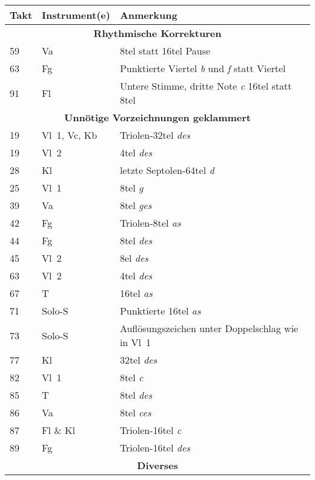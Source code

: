\documentclass[a4paper,9pt]{extarticle}
\newcommand{\note}[1]{\textsl{#1}}
\begin{document}
\begin{center}

\begin{tabular}{lll}
\toprule
\textbf{Takt} & \textbf{Instrument(e)} & \textbf{Anmerkung}\\

\midrule
\multicolumn{3}{c}{\textbf{Rhythmische Korrekturen}}\\
\midrule
59 & Va & 8tel statt 16tel Pause\\
63 & Fg & Punktierte Viertel \note{b} und \note{f} statt Viertel\\
91 & Fl & Untere Stimme, dritte Note \note{c} 16tel statt 8tel\\

\midrule
\multicolumn{3}{c}{\textbf{Unnötige Vorzeichnungen geklammert}}\\
\midrule
19 & Vl~1, Vc, Kb & Triolen-32tel \note{des}\\
19 & Vl~2 & 4tel \note{des}\\
28 & Kl & letzte Septolen-64tel \note{d}\\
25 & Vl~1 & 8tel \note{g}\\
39 & Va &  8tel \note{ges}\\
42 & Fg & Triolen-8tel \note{as}\\
44 & Fg & 8tel \note{des}\\
45 & Vl~2 & 8el \note{des}\\
63 & Vl~2 & 4tel \note{des}\\
67 & T & 16tel \note{as}\\
71 & Solo-S & Punktierte 16tel \note{as}\\
73 & Solo-S & Auflösungszeichen unter Doppelschlag wie in Vl~1\\
77 & Kl & 32tel \note{des}\\
82 & Vl~1 & 8tel \note{c}\\
85 & T & 8tel \note{des}\\
86 & Va & 8tel \note{ces}\\
87 & Fl \& Kl & Triolen-16tel \note{c}\\
89 & Fg & Triolen-16tel \note{des}\\

\midrule
\multicolumn{3}{c}{\textbf{Diverses}}\\
\midrule


\end{tabular}
\end{center}
\end{document}
